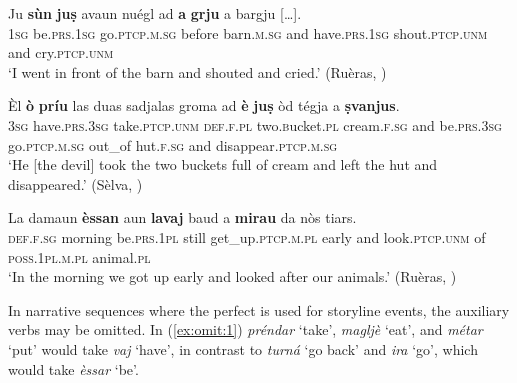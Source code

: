 \ea\label{ex:diff:aux1}
\gll Ju \textbf{sùn} \textbf{juṣ} avaun nuégl ad \textbf{a} \textbf{grju} a bargju […].\\
\textsc{1sg}  be.\textsc{prs.1sg}  go.\textsc{ptcp.m.sg} before barn.\textsc{m.sg} and have.\textsc{prs.1sg} shout.\textsc{ptcp.unm} and cry.\textsc{ptcp.unm}\\
\glt `I went in front of the barn and shouted and cried.' (Ruèras, \citealt[69]{Büchli1966})
\z

\ea\label{ex:diff:aux3}
\gll Èl \textbf{ò} \textbf{príu} las duas sadjalas groma ad \textbf{è} \textbf{juṣ} òd tégja a \textbf{ṣvanjus}.\\
\textsc{3sg}  have.\textsc{prs.3sg} take.\textsc{ptcp.unm} \textsc{def.f.pl} two.\textsc bucket.\textsc{pl}  cream.\textsc{f.sg} and be.\textsc{prs.3sg} go.\textsc{ptcp.m.sg} out\_of hut.\textsc{f.sg} and disappear.\textsc{ptcp.m.sg}\\
\glt `He [the devil] took the two buckets full of cream and left the hut and disappeared.' (Sèlva, \citealt[47]{Büchli1966})
\z

\ea\label{ex:diff:aux2}
\gll La damaun \textbf{èssan} aun \textbf{lavaj} baud a \textbf{mirau} da nòs tiars.\\
\textsc{def.f.sg}  morning be.\textsc{prs.1pl} still get\_up.\textsc{ptcp.m.pl} early and look.\textsc{ptcp.unm} of \textsc{poss.1pl.m.pl} animal.\textsc{pl}\\
\glt `In the morning we got up early and looked after our animals.' (Ruèras, \citealt[68]{Büchli1966})
\z

In narrative sequences where the perfect is used for storyline events, the auxiliary verbs may be omitted. In (\ref{ex:omit:1}) \textit{préndar} `take', \textit{magljè} `eat', and \textit{métar} `put' would take \textit{vaj} `have', in contrast to \textit{turná} `go back' and \textit{ira} `go', which would take \textit{èssar} `be'.

